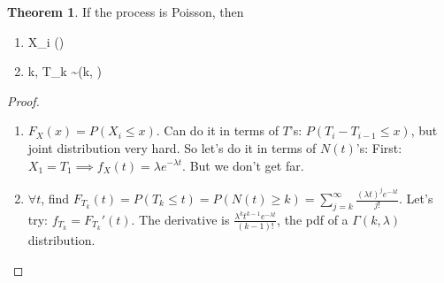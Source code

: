 \documentclass{article}
\theoremstyle{definition}
\newtheorem{theorem}{Theorem}[section]
\begin{document}
\begin{theorem}
If the process is Poisson, then
\begin{enumerate}
\item X_i  \exp(\lambda)
\item \forall k, T_k \sim \Gamma(k, \lambda)
\end{enumerate}
\begin{proof}
\begin{enumerate}
\item $F_X(x) = P(X_i \le x)$. Can do it in terms of $T$'s: $P(T_i - T_{i-1} \le x)$, but joint distribution very hard. So let's do it in terms of $N(t)$'s:
First: $X_1 = T_1 \implies f_X(t) = \lambda e^{-\lambda t}$. But we don't get far. 
\item $\forall t$, find $F_{T_k}(t) = P(T_k \le t) = P(N(t) \ge k) = \sum_{j=k}^\infty \tfrac{(\lambda t)^j e^{-\lambda t}}{j!}$.
Let's try: $f_{T_k} = F_{T_k}'(t)$. The derivative is 
$\frac{\lambda^k t^{k-1} e^{-\lambda t}}{(k-1)!}$, the pdf of a $\Gamma(k, \lambda)$ distribution. 
\end{enumerate}
\end{proof}
\end{theorem}
\end{document}
